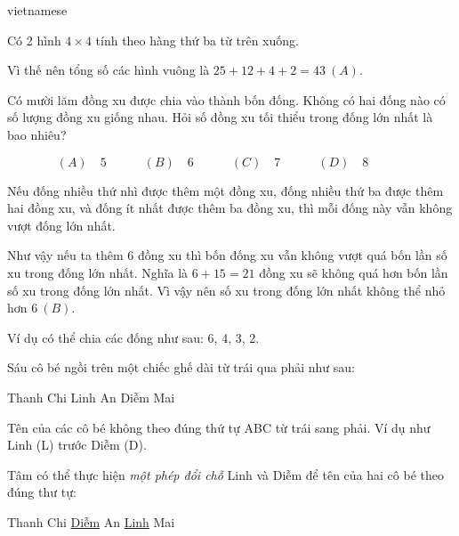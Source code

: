\documentclass{article}
\begin{document}
\begin{otherlanguage*}{vietnamese}
\begin{soln}
    Có 2 hình $4\times 4$ tính theo hàng thứ ba từ trên xuống.

    Vì thế nên tổng số các hình vuông là $25 + 12 + 4 + 2 = \boxed{43\ (A)}.$
\end{soln}

\bigbreak

\begin{problem*}[PI-2024-C-P18]
    \label{problem:pi-2024-c-p18}

    Có mười lăm đồng xu được chia vào thành bốn đống. Không có hai đống nào có số lượng đồng xu giống nhau.
    Hỏi số đồng xu tối thiểu trong đống lớn nhất là bao nhiêu?

    \[
        (A) \quad 5 \qquad \quad
        (B) \quad 6 \qquad \quad
        (C) \quad 7 \qquad \quad
        (D) \quad 8 \qquad \quad
    \]
\end{problem*}

\begin{soln}
    Nếu đống nhiều thứ nhì được thêm một đồng xu, đống nhiều thứ ba được thêm hai đồng xu,
    và đống ít nhất được thêm ba đồng xu, thì mỗi đống này vẫn không vượt đống lớn nhất.

    Như vậy nếu ta thêm 6 đồng xu thì bốn đống xu vẫn không vượt quá bốn lần số xu trong đống lớn nhất.
    Nghĩa là $6+15=21$ đồng xu sẽ không quá hơn bốn lần số xu trong đống lớn nhất.
    Vì vậy nên số xu trong đống lớn nhất không thể nhỏ hơn $\boxed{6\ (B).}$

    Ví dụ có thể chia các đống như sau: 6, 4, 3, 2.
\end{soln}

\bigbreak

\begin{problem*}[PI-2024-C-P19]
    \label{problem:pi-2024-c-p19}

    Sáu cô bé ngồi trên một chiếc ghế dài từ trái qua phải như sau:
    \begin{center}
        Thanh \quad Chi \quad Linh \quad An \quad Diễm \quad Mai
    \end{center}

    Tên của các cô bé không theo đúng thứ tự ABC từ trái sang phải. Ví dụ như Linh (L) trước Diễm (D).

    Tâm có thể thực hiện \textit{một phép đổi chỗ} Linh và Diễm để tên của hai cô bé theo đúng thư tự:
    \begin{center}
        Thanh \quad Chi \quad \underline{Diễm} \quad An \quad \underline{Linh} \quad Mai
    \end{center}


\end{problem*}
\end{otherlanguage*}
\end{document}
